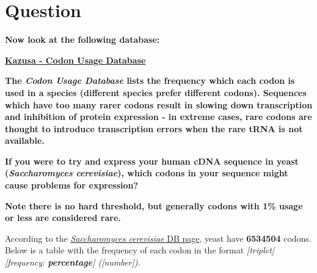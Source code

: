 \section{Question}

\large{\textbf{Now look at the following database:}}

\large{\textbf{\href{http://www.kazusa.or.jp/codon/}{Kazusa - Codon Usage Database}}}

\large{\textbf{The \textit{Codon Usage Database} lists the frequency which each codon is used in a species (different species prefer different codons). Sequences which have too many rarer codons result in slowing down transcription and inhibition of protein expression - in extreme cases, rare codons are thought to introduce transcription errors when the rare tRNA is not available.}}

\large{\textbf{If you were to try and express your human cDNA sequence in yeast (\textit{Saccharomyces cerevisiae}), which codons in your sequence might cause problems for expression?}}

\textbf{Note there is no hard threshold, but generally codons with 1\% usage or less are considered rare.}

\bigskip

According to the \href{http://www.kazusa.or.jp/codon/cgi-bin/showcodon.cgi?species=4932}{\textit{Saccharomyces cerevisiae} DB page}, yeast have \textbf{6534504} codons. Below is a table with the frequency of each codon in the format \textit{[triplet] [frequency: \textbf{percentage}] ([number])}.


